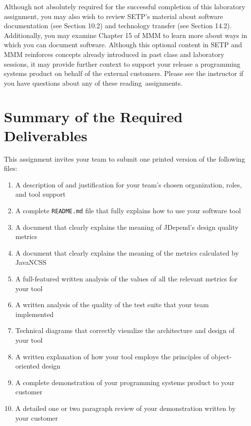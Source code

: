 Although not absolutely required for the successful completion of this laboratory assignment, you may also wish to
review SETP's material about software documentation (see Section 10.2) and technology transfer (see Section 14.2).
Additionally, you may examine Chapter 15 of MMM to learn more about ways in which you can document software. Although
this optional content in SETP and MMM reinforces concepts already introduced in past class and laboratory sessions, it
may provide further context to support your release a programming systems product on behalf of the external customers.
Please see the instructor if you have questions about any of these \mbox{reading assignments}.

\section*{Summary of the Required Deliverables}

This assignment invites your team to submit one printed version of the following files:

\vspace*{-.1in}
\begin{enumerate}
  \itemsep0em
  \item A description of and justification for your team's chosen organization, roles, and tool support
  \item A complete {\tt README.md} file that fully explains how to use your software tool
  \item A document that clearly explains the meaning of JDepend's design quality metrics
  \item A document that clearly explains the meaning of the metrics calculated by JavaNCSS
  \item A full-featured written analysis of the values of all the relevant metrics for your tool
  \item A written analysis of the quality of the test suite that your team implemented
  \item Technical diagrams that correctly visualize the architecture and design of your tool
  \item A written explanation of how your tool employs the principles of object-oriented design
  \item A complete demonstration of your programming systems product to your customer
  \item A detailed one or two paragraph review of your demonstration written by your customer
\end{enumerate}
\vspace*{-.1in}


\printbibliography[filter=papers,title={References}]



